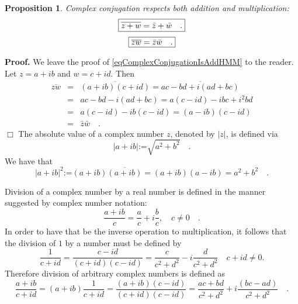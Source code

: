 \documentclass[12pt]{book}
\newcommand{\eqdef}{\textbf{:=}}
\newcommand{\importantFormula}[1]{\begin{equation} \boxed{#1} \end{equation}}
\newenvironment{proof}[1][]{ \textbf{Proof#1.} }{$\Box$\medskip}
\newtheorem{proposition}[theorem]{Proposition}
\begin{document}
\begin{proposition}
Complex conjugation respects both addition and multiplication:
\importantFormula{
\label{eqComplexConjugationIsAddHMM} 
\overline {z +w}= \bar z +\bar w\quad .
}
\importantFormula{
\label{eqComplexConjugationIsFieldHMM}  \overline {z w}= \bar z \bar w\quad .
}

\end{proposition}
\begin{proof}
We leave the proof of \eqref{eqComplexConjugationIsAddHMM} to the reader. Let $z= a+ib$ and $w=c+id$. Then
\begin{equation*}
\begin{array}{rcl}\overline {zw}&=& \overline{(a+ib)(c+id)}= \overline{ac-bd +i(ad+bc) }\\&=& ac-bd-i(ad+bc)= a(c-id)-ibc+i^{2}bd\\&=& a(c-id)-ib(c-id)= (a-ib)(c-id)\\&=&\bar z \bar w\quad .
\end{array}
\end{equation*}
\end{proof}
  The absolute value of a complex number $z$, denoted by $|z|$, is defined via
\[
|a+ib|\eqdef \sqrt{a^2+b^2}\quad .
\]
We have that 
\[
|a+ib|^2\eqdef (a+ib)\overline{(a+ib)}=(a+ib)(a-ib)=a^2+b^2 \quad .
\]

Division of a complex number by a real number is defined in the manner suggested by complex number notation:
\[
\frac{a+ib}{c}= \frac{a}{c}+i\frac{b}{c}, \quad c\neq 0\quad .
\]
In order to have that be the inverse operation to multiplication, it follows that the division of $1$ by a number must be defined by
\[
\frac{1}{c+id}= \frac{c-id}{(c+id)(c-id)}=\frac{c}{c^2+d^2}-i\frac{d}{c^2+d^2}  \quad c+id\neq 0.
\]
Therefore division of arbitrary complex numbers is defined as 
\[
\frac{a+ib}{c+id}=(a+ib)\frac{1}{c+id}= \frac{(a+ib)(c-id)}{(c+id)(c-id)}= \frac{ac+bd}{c^2+d^2}+i\frac{(bc-ad)}{c^2+d^2} \quad .
\]
\end{document}
